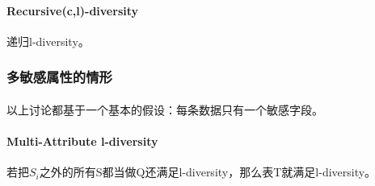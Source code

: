 \documentclass[12pt,a4paper]{article}
\begin{document}
\paragraph{Recursive(c,l)-diversity} 递归l-diversity。 

\subsubsection{多敏感属性的情形}
\paragraph{} 以上讨论都基于一个基本的假设：每条数据只有一个敏感字段。
\paragraph{Multi-Attribute l-diversity} 若把$S_i$之外的所有S都当做Q还满足l-diversity，那么表T就满足l-diversity。









\end{document}
